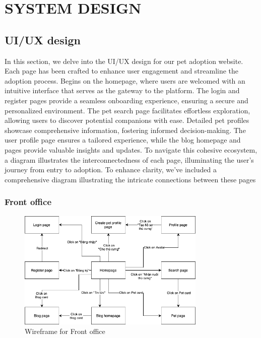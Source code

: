 \chapter{SYSTEM DESIGN}

\section{UI/UX design}

In this section, we delve into the UI/UX design for our pet adoption website. Each page has been crafted to enhance user engagement and streamline the adoption process. Begins on the homepage, where users are welcomed with an intuitive interface that serves as the gateway to the platform. The login and register pages provide a seamless onboarding experience, ensuring a secure and personalized environment. The pet search page facilitates effortless exploration, allowing users to discover potential companions with ease. Detailed pet profiles showcase comprehensive information, fostering informed decision-making. The user profile page ensures a tailored experience, while the blog homepage and pages provide valuable insights and updates. To navigate this cohesive ecosystem, a diagram illustrates the interconnectedness of each page, illuminating the user's journey from entry to adoption. To enhance clarity, we've included a comprehensive diagram illustrating the intricate connections between these pages
\subsection{Front office}

\begin{figure}[H]
    \centering
    \includegraphics[width=0.8\textwidth]{Figures/wireframe_fo.png}
    \caption{Wireframe for Front office}
\end{figure}

